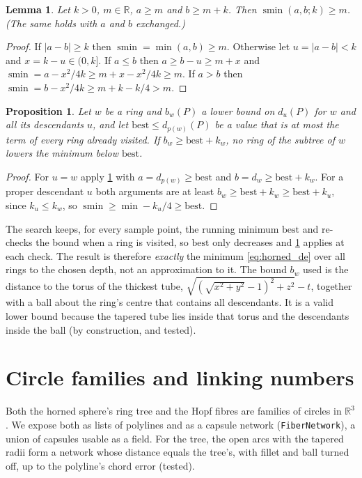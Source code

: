 \documentclass[11pt,a4paper]{article}
\newtheorem{lemma}{Lemma}
\newtheorem{proposition}{Proposition}
\theoremstyle{remark}
\newcommand{\R}{\mathbb{R}}
\newcommand{\code}[1]{\texttt{#1}}
\newcommand{\smin}{\operatorname{smin}}
\begin{document}
\begin{lemma}\label{lem:smin}
Let $k>0$, $m\in\R$, $a\ge m$ and $b\ge m+k$.  Then $\smin(a,b;k)\ge m$.  (The same holds with $a$ and $b$ exchanged.)
\end{lemma}
\begin{proof}
If $|a-b|\ge k$ then $\smin=\min(a,b)\ge m$.  Otherwise let $u=|a-b|<k$ and $x=k-u\in(0,k]$.  If $a\le b$ then $a\ge b-u\ge m+x$ and $\smin=a-x^2/4k\ge m+x-x^2/4k\ge m$.
If $a>b$ then $\smin=b-x^2/4k\ge m+k-k/4>m$.
\end{proof}

\begin{proposition}\label{prop:prune}
Let $w$ be a ring and $b_w(P)$ a lower bound on $d_u(P)$ for $w$ and all its descendants $u$, and let $\mathrm{best}\le d_{p(w)}(P)$ be a value that is at most the term of every ring already
visited.  If $b_w\ge \mathrm{best}+k_w$, no ring of the subtree of $w$ lowers the minimum below $\mathrm{best}$.
\end{proposition}
\begin{proof}
For $u=w$ apply \cref{lem:smin} with $a=d_{p(w)}\ge\mathrm{best}$ and $b=d_w\ge \mathrm{best}+k_w$.  For a proper descendant $u$ both arguments are at least $b_w\ge\mathrm{best}+k_w\ge\mathrm{best}+k_u$, since $k_u\le k_w$, so $\smin\ge\min-k_u/4\ge\mathrm{best}$.
\end{proof}

The search keeps, for every sample point, the running minimum $\mathrm{best}$ and re-checks the bound when a ring is visited, so $\mathrm{best}$ only decreases and \cref{prop:prune} applies at each check.  The result is therefore \emph{exactly} the minimum \eqref{eq:horned_de} over all rings to the chosen depth, not an approximation to it.
The bound $b_w$ used is the distance to the torus of the thickest tube, $\sqrt{(\sqrt{x^2+y^2}-1)^2+z^2}-t$, together with a ball about the ring's centre that contains all descendants.  It is a valid lower bound because the tapered tube lies inside that torus and the descendants inside the ball (by construction, and tested).


\section{Circle families and linking numbers}
\label{sec:linking}

Both the horned sphere's ring tree and the Hopf fibres are families of circles in $\R^3$.  We expose both as lists of polylines and as a capsule network (\code{FiberNetwork}), a union of capsules usable as a field.  For the tree, the open arcs with the tapered radii form a network whose distance equals the tree's, with fillet and ball turned off, up to the polyline's chord error (tested).
\end{document}

